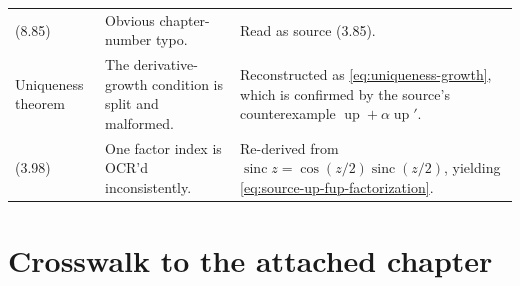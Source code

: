 \documentclass[11pt]{article}
\theoremstyle{definition}
\theoremstyle{remark}
\newcommand{\Up}{\operatorname{up}}
\newcommand{\sinc}{\operatorname{sinc}}
\begin{document}
\begin{longtable}{>{\raggedright\arraybackslash}p{} >{\raggedright\arraybackslash}p{} >{\raggedright\arraybackslash}p{}}
(8.85) & Obvious chapter-number typo. & Read as source (3.85).\\
Uniqueness theorem & The derivative-growth condition is split and malformed. & Reconstructed as \eqref{eq:uniqueness-growth}, which is confirmed by the source's counterexample \(\Up+\alpha\Up'\).\\
(3.98) & One factor index is OCR'd inconsistently. & Re-derived from \(\sinc z=\cos(z/2)\sinc(z/2)\), yielding \eqref{eq:source-up-fup-factorization}.\\
\bottomrule
\end{longtable}

\section{Crosswalk to the attached chapter}
\label{app:crosswalk}
\end{document}

